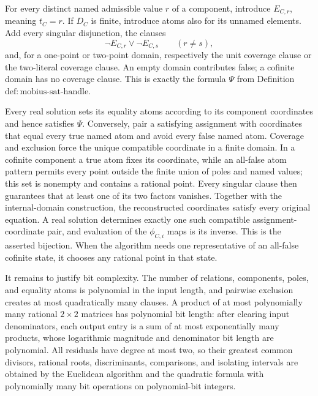 For every distinct named admissible value \(r\) of a component, introduce \(E_{C,r}\), meaning \(t_C=r\).  If \(D_C\) is finite, introduce atoms also for its unnamed elements.  Add every singular disjunction, the clauses
\[
\neg E_{C,r}\lor\neg E_{C,s}\qquad(r\ne s),
\]
and, for a one-point or two-point domain, respectively the unit coverage clause or the two-literal coverage clause.  An empty domain contributes false; a cofinite domain has no coverage clause.  This is exactly the formula \(\Psi\) from Definition~\(\mathrm{def:mobius\mbox{-}sat\mbox{-}handle}\).

Every real solution sets its equality atoms according to its component coordinates and hence satisfies \(\Psi\).  Conversely, pair a satisfying assignment with coordinates that equal every true named atom and avoid every false named atom.  Coverage and exclusion force the unique compatible coordinate in a finite domain.  In a cofinite component a true atom fixes its coordinate, while an all-false atom pattern permits every point outside the finite union of poles and named values; this set is nonempty and contains a rational point.  Every singular clause then guarantees that at least one of its two factors vanishes.  Together with the internal-domain construction, the reconstructed coordinates satisfy every original equation.  A real solution determines exactly one such compatible assignment-coordinate pair, and evaluation of the \(\phi_{C,i}\) maps is its inverse.  This is the asserted bijection.  When the algorithm needs one representative of an all-false cofinite state, it chooses any rational point in that state.

It remains to justify bit complexity.  The number of relations, components, poles, and equality atoms is polynomial in the input length, and pairwise exclusion creates at most quadratically many clauses.  A product of at most polynomially many rational \(2\times2\) matrices has polynomial bit length: after clearing input denominators, each output entry is a sum of at most exponentially many products, whose logarithmic magnitude and denominator bit length are polynomial.  All residuals have degree at most two, so their greatest common divisors, rational roots, discriminants, comparisons, and isolating intervals are obtained by the Euclidean algorithm and the quadratic formula with polynomially many bit operations on polynomial-bit integers.


